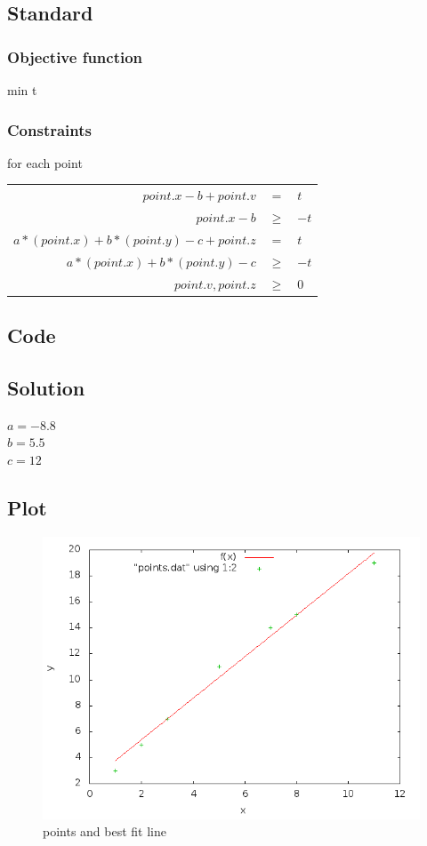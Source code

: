 \documentclass[letterpaper,10pt]{article}
\begin{document}
	\subsection{Standard}
	\subsubsection{Objective function} 
	min t

	\subsubsection{Constraints}
	for each point

	\begin{tabular}{rcl}
		$point.x - b + point.v$&$ = $&$t$\\
		$point.x - b$&$ \ge $&$-t$\\
		$a*(point.x)+b*(point.y)-c + point.z$&$ = $&$t$\\
		$a*(point.x)+b*(point.y)-c $&$\ge$&$ -t$\\
		$point.v, point.z $&$\ge$&$ 0$
	\end{tabular}

 

	\subsection{Code}
	

	\subsection{Solution}
	$a=-8.8$\\
	$b=5.5$\\
	$c=12$


	\subsection{Plot}
		\begin{figure}[!htb]
			\centering
			\includegraphics[scale=.5]{plot.png}
			\caption{points and best fit line}
			\label{fig:algcomp}
		\end{figure}
\end{document}
